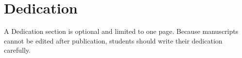 \chapter[unnumbered=true]{Dedication}

A Dedication section is optional and limited to one page.
Because manuscripts cannot be edited after publication, students should write their dedication carefully.
